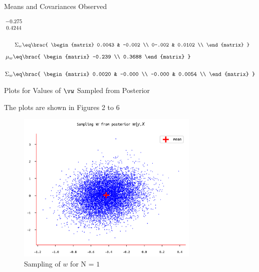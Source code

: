 \documentclass{article}
\begin{document}
\begin{question}
\begin{qsection}{Means and Covariances Observed}
\begin{enumerate}
\begin{align*}
{\begin{matrix}
							-0.275 \\
							0.4244
						\end{matrix}
					} \\\\
					\Sigma_w	&\eq	\brac{
						\begin{matrix}
							0.0043 &	-0.002	\\
							0-.002 &	0.0102	\\
						\end{matrix}
					}
				\end{align*}
			\ditem[N = 20]
				\begin{align*}
					\mu_w		&\eq	\brac{
						\begin{matrix}
							-0.239 \\
							0.3688
						\end{matrix}
					} \\\\
					\Sigma_w	&\eq	\brac{
						\begin{matrix}
							0.0020 &	-0.000	\\
							-0.000 &	0.0054	\\
						\end{matrix}
					}
				\end{align*}
		\end{enumerate}

	\end{qsection}

	\begin{qsection}{Plots for Values of $\vw$ Sampled from Posterior}

		The plots are shown in Figures 2 to 6

		\begin{figure}[h!]
			\centering
			\includegraphics[height=275px]{includes/plots/q4b/posterior-samples-1.png}
			\caption{Sampling of $w$ for N = $1$}
		\end{figure}


\end{qsection}
\end{question}
\end{document}
